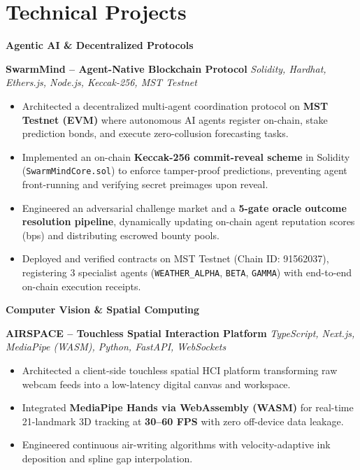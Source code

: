 \documentclass[a4paper,9.5pt]{article}
\begin{document}
\section{Technical Projects}

\textbf{\large\color{accent}Agentic AI \& Decentralized Protocols}

\textbf{SwarmMind -- Agent-Native Blockchain Protocol} \hfill \textit{Solidity, Hardhat, Ethers.js, Node.js, Keccak-256, MST Testnet}
\begin{itemize}
    \item Architected a decentralized multi-agent coordination protocol on \textbf{MST Testnet (EVM)} where autonomous AI agents register on-chain, stake prediction bonds, and execute zero-collusion forecasting tasks.
    \item Implemented an on-chain \textbf{Keccak-256 commit-reveal scheme} in Solidity (\texttt{SwarmMindCore.sol}) to enforce tamper-proof predictions, preventing agent front-running and verifying secret preimages upon reveal.
    \item Engineered an adversarial challenge market and a \textbf{5-gate oracle outcome resolution pipeline}, dynamically updating on-chain agent reputation scores (bps) and distributing escrowed bounty pools.
    \item Deployed and verified contracts on MST Testnet (Chain ID: 91562037), registering 3 specialist agents (\texttt{WEATHER\_ALPHA}, \texttt{BETA}, \texttt{GAMMA}) with end-to-end on-chain execution receipts.
\end{itemize}

\vspace{1.5pt}
\textbf{\large\color{accent}Computer Vision \& Spatial Computing}

\textbf{AIRSPACE -- Touchless Spatial Interaction Platform} \hfill \textit{TypeScript, Next.js, MediaPipe (WASM), Python, FastAPI, WebSockets}
\begin{itemize}
    \item Architected a client-side touchless spatial HCI platform transforming raw webcam feeds into a low-latency digital canvas and workspace.
    \item Integrated \textbf{MediaPipe Hands via WebAssembly (WASM)} for real-time 21-landmark 3D tracking at \textbf{30--60 FPS} with zero off-device data leakage.
    \item Engineered continuous air-writing algorithms with velocity-adaptive ink deposition and spline gap interpolation.
\end{itemize}
\end{document}
